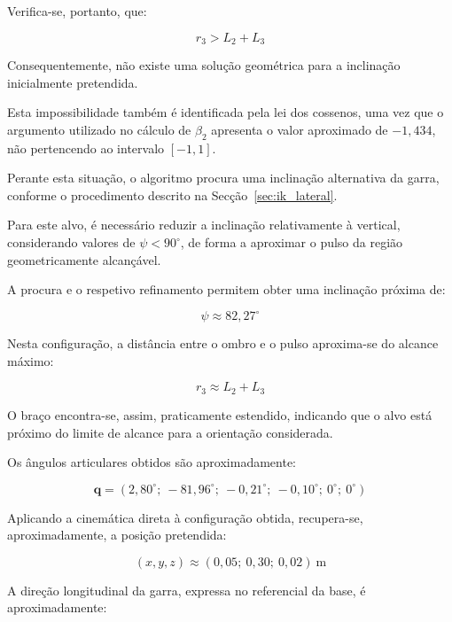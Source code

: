 Verifica-se, portanto, que:

\begin{equation}
    r_3>L_2+L_3
\end{equation}

Consequentemente, não existe uma solução geométrica para a inclinação inicialmente pretendida.

Esta impossibilidade também é identificada pela lei dos cossenos, uma vez que o argumento utilizado no cálculo de $\beta_2$ apresenta o valor aproximado de $-1{,}434$, não pertencendo ao intervalo $[-1,1]$.

Perante esta situação, o algoritmo procura uma inclinação alternativa da garra, conforme o procedimento descrito na Secção~\ref{sec:ik_lateral}.

Para este alvo, é necessário reduzir a inclinação relativamente à vertical, considerando valores de $\psi<90^\circ$, de forma a aproximar o pulso da região geometricamente alcançável.

A procura e o respetivo refinamento permitem obter uma inclinação próxima de:

\begin{equation}
    \psi\approx82{,}27^\circ
\end{equation}

Nesta configuração, a distância entre o ombro e o pulso aproxima-se do alcance máximo:

\begin{equation}
    r_3\approx L_2+L_3
\end{equation}

O braço encontra-se, assim, praticamente estendido, indicando que o alvo está próximo do limite de alcance para a orientação considerada.

Os ângulos articulares obtidos são aproximadamente:

\begin{equation}
    \boxed{
    \mathbf{q}=
    (2{,}80^\circ;\
    -81{,}96^\circ;\
    -0{,}21^\circ;\
    -0{,}10^\circ;\
    0^\circ;\
    0^\circ)
    }
    \label{eq:ik_exemplo2}
\end{equation}

Aplicando a cinemática direta à configuração obtida, recupera-se, aproximadamente, a posição pretendida:

\begin{equation}
    (x,y,z)\approx
    (0{,}05;\ 0{,}30;\ 0{,}02)
    \ \text{m}
\end{equation}

A direção longitudinal da garra, expressa no referencial da base, é aproximadamente:

